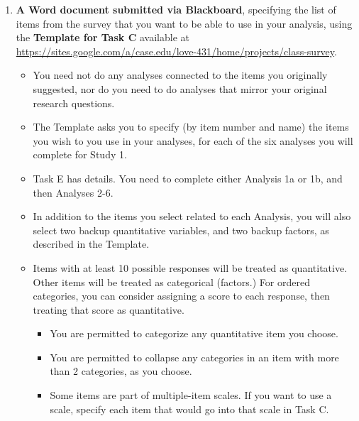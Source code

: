 \documentclass[]{book}
\providecommand{\tightlist}{%
  \setlength{\itemsep}{0pt}\setlength{\parskip}{0pt}}
\theoremstyle{definition}
\theoremstyle{definition}
\theoremstyle{definition}
\theoremstyle{remark}
\begin{document}
\begin{enumerate}
\def\labelenumi{\arabic{enumi}.}
\tightlist
\item
  \textbf{A Word document submitted via Blackboard}, specifying the list
  of items from the survey that you want to be able to use in your
  analysis, using the \textbf{Template for Task C} available at
  \url{https://sites.google.com/a/case.edu/love-431/home/projects/class-survey}.

  \begin{itemize}
  \tightlist
  \item
    You need not do any analyses connected to the items you originally
    suggested, nor do you need to do analyses that mirror your original
    research questions.
  \item
    The Template asks you to specify (by item number and name) the items
    you wish to you use in your analyses, for each of the six analyses
    you will complete for Study 1.
  \item
    Task E has details. You need to complete either Analysis 1a or 1b,
    and then Analyses 2-6.
  \item
    In addition to the items you select related to each Analysis, you
    will also select two backup quantitative variables, and two backup
    factors, as described in the Template.
  \item
    Items with at least 10 possible responses will be treated as
    quantitative. Other items will be treated as categorical (factors.)
    For ordered categories, you can consider assigning a score to each
    response, then treating that score as quantitative.

    \begin{itemize}
    \tightlist
    \item
      You are permitted to categorize any quantitative item you choose.
    \item
      You are permitted to collapse any categories in an item with more
      than 2 categories, as you choose.
    \item
      Some items are part of multiple-item scales. If you want to use a
      scale, specify each item that would go into that scale in Task C.
    \end{itemize}
  \end{itemize}
\end{enumerate}
\end{document}
